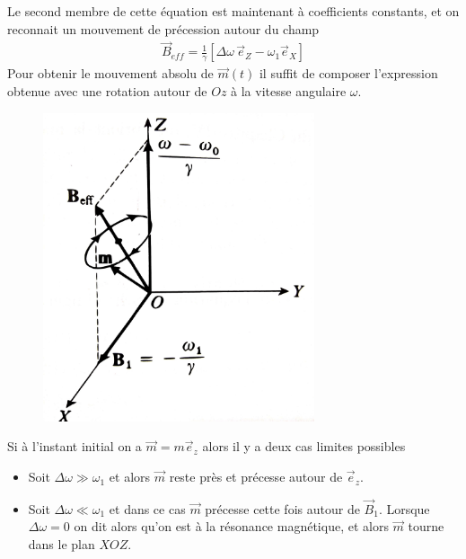 \documentclass[12pt,prb,aps,epsf]{article}
\begin{document}
Le second membre de cette équation est maintenant à coefficients constants, et on reconnait un mouvement de précession autour du champ 
\begin{eqnarray}
\vec{B}_{eff} = \frac{1}{\gamma} [\Delta \omega \,\vec{e}_Z - \omega_1 \vec{e}_X]
\end{eqnarray}
Pour obtenir le mouvement absolu de $\vec{m}(t)$ il suffit de composer l'expression obtenue avec une rotation autour de $Oz$ à la vitesse angulaire $\omega$.

\begin{figure}[h]
	\centerline{\includegraphics[width=8cm]{bef}}
\end{figure}

Si à l'instant initial on a $\vec{m} = m\vec{e}_z$ alors il y a deux cas limites possibles 
\begin{itemize}
	\item Soit $\Delta \omega \gg \omega_1$ et alors $\vec{m}$ reste près et précesse autour de $\vec{e}_z$.
	\item Soit $\Delta \omega \ll \omega_1$ et dans ce cas $\vec{m}$ précesse cette fois autour de $\vec{B}_1$. Lorsque $\Delta \omega = 0$ on dit alors qu'on est à la résonance magnétique, et alors $\vec{m}$ tourne dans le plan $XOZ$.
\end{itemize}
\end{document}
